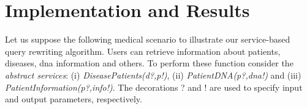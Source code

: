 \section{Implementation and Results}
\label{sec:implementationandresults}  
Let us suppose the following medical scenario to illustrate our service-based query rewriting algorithm. 
Users can retrieve information about patients, diseases, dna information and others.
To perform these function consider the \textit{abstract services}: (i)
\textit{DiseasePatients(d?,p!)}, (ii) \textit{PatientDNA(p?,dna!)} and (iii)
\textit{PatientInformation(p?,info!)}.
The decorations ? and ! are used to specify input and output parameters, respectively. 
% 



